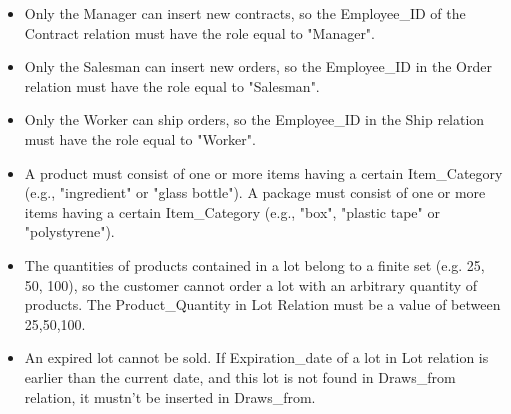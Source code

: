 \begin{itemize}
\item Only the Manager can insert new contracts, so the Employee\_ID of the Contract relation must have the role equal to "Manager". 
\item Only the Salesman can insert new orders, so the Employee\_ID in the Order relation must have the role equal to "Salesman". 
\item Only the Worker can ship orders, so the Employee\_ID in the Ship relation must have the role equal to "Worker".
\item A product must consist of one or more items having a certain Item\_Category (e.g., "ingredient" or "glass bottle"). A package must consist of one or more items having a certain Item\_Category (e.g., "box", "plastic tape" or "polystyrene"). 
\item The quantities of products contained in a lot belong to a finite set (e.g. 25, 50, 100), so the customer cannot order a lot with an arbitrary quantity of products. The Product\_Quantity in Lot Relation must be a value of between 25,50,100.
\item An expired lot cannot be sold. If Expiration\_date of a lot in  Lot relation is earlier than the current date, and this lot is not found in Draws\_from relation, it mustn't be  inserted in Draws\_from.
\end{itemize}